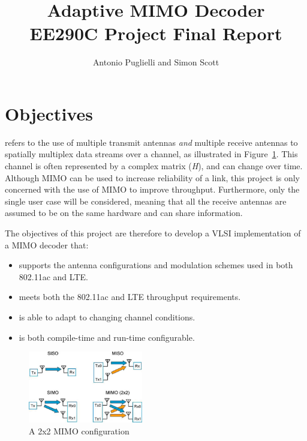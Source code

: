 \documentclass[journal]{IEEEtran}
\begin{document}
\title{Adaptive MIMO Decoder \\ {\Large EE290C Project Final Report}}

%

\author{Antonio Puglielli and Simon Scott}


\maketitle

\section{Objectives}

 refers to the use of multiple transmit antennas {\em and} multiple receive antennas to spatially multiplex data streams over a channel, as illustrated in Figure~\ref{mimo_cartoon}. This channel is often represented by a complex matrix ({\em H}), and can change over time. Although MIMO can be used to increase reliability of a link, this project is only concerned with the use of MIMO to improve throughput. Furthermore, only the single user case will be considered, meaning that all the receive antennas are assumed to be on the same hardware and can share information.

The objectives of this project are therefore to develop a VLSI implementation of a MIMO decoder that:
\begin{itemize}
\item supports the antenna configurations and modulation schemes used in both 802.11ac and LTE.
\item meets both the 802.11ac and LTE throughput requirements.
\item is able to adapt to changing channel conditions.
\item is both compile-time and run-time configurable.
\end{itemize}

\begin{figure}[!h]
\centering
\includegraphics*[width=5cm, viewport = 300 0 560 130]{images/agilent_mimo.jpg}
\caption{A 2x2 MIMO configuration}
\label{mimo_cartoon}
\end{figure}
\end{document}
